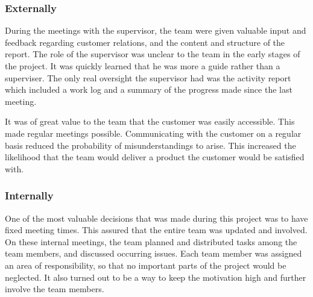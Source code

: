 \subsubsection{Externally}
During the meetings with the supervisor, the team were given valuable input and feedback regarding customer relations, and the content and structure of the report. The role of the supervisor was unclear to the team in the early stages of the project. It was quickly learned that he was more a guide rather than a superviser. The only real oversight the supervisor had was the activity report which included a work log and a summary of the progress made since the last meeting.

It was of great value to the team that the customer was easily accessible. This made regular meetings possible. Communicating with the customer on a regular basis reduced the probability of misunderstandings to arise. This increased the likelihood that the team would deliver a product the customer would be satisfied with.
 
\subsubsection{Internally}
One of the most valuable decisions that was made during this project was to have fixed meeting times. This assured that the entire team was updated and involved. On these internal meetings, the team planned and distributed tasks among the team members, and discussed occurring issues. Each team member was assigned an area of responsibility, so that no important parts of the project would be neglected. It also turned out to be a way to keep the motivation high and further involve the team members.


